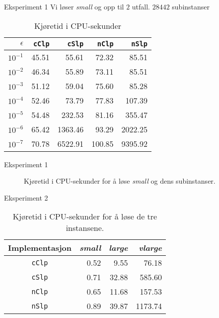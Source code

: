 \documentclass{beamer}
\begin{document}
\begin{frame}{Eksperiment 1}
Vi løser \textit{small} og opp til $2$ utfall. $28 442$ subinstanser
\begin{table}[ht!]
\centering
\caption{Kjøretid i CPU-sekunder}
\begin{tabular}{rrrrr}
$\epsilon$ & \texttt{cClp} & \texttt{cSlp} & \texttt{nClp} & \texttt{nSlp} \\ \hline
$10^{-1}$ & 45.51 & 55.61 & 72.32 & 85.51 \\
$10^{-2}$ & 46.34 & 55.89 & 73.11 & 85.51 \\
$10^{-3}$ & 51.12 & 59.04 & 75.60 & 85.28 \\
$10^{-4}$ & 52.46 & 73.79 & 77.83 & 107.39 \\
$10^{-5}$ & 54.48 & 232.53 & 81.16 & 355.47 \\
$10^{-6}$ & 65.42 & 1363.46 & 93.29 & 2022.25 \\
$10^{-7}$ & 70.78 & 6522.91 & 100.85 & 9395.92
\end{tabular}
\label{table:expone}
\end{table}
\end{frame}



\begin{frame}{Eksperiment 1}
\begin{figure}[ht!]
    \centering
    
    \caption{Kjøretid i CPU-sekunder for å løse \textit{small} og dens subinstanser.}
    \label{fig:smalltolerance}
\end{figure}
\end{frame}



\begin{frame}{Eksperiment 2}
\begin{table}
\centering
\caption{Kjøretid i CPU-sekunder for å løse de tre instansene.}
\label{table:eps4instances}
\begin{tabular}{crrr}
\textrm{Implementasjon} & \textit{small} & \textit{large} & \textit{vlarge} \\ \hline
\texttt{cClp}           & 0.52           & 9.55           & 76.18 \\
\texttt{cSlp}           & 0.71           & 32.88          & 585.60 \\
\texttt{nClp}           & 0.65           & 11.68          & 157.53 \\
\texttt{nSlp}           & 0.89           & 39.87          & 1173.74
\end{tabular}
\end{table}
\end{frame}
\end{document}
